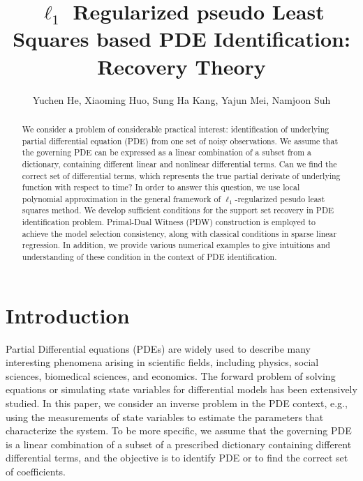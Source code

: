 \documentclass[a4paper,11pt]{article}
\theoremstyle{definition}
\begin{document}
\title{$\ell_1$ Regularized pseudo Least Squares based PDE Identification:
Recovery Theory }%
\author{Yuchen He, Xiaoming Huo, Sung Ha Kang, Yajun Mei, Namjoon Suh}
\maketitle
\begin{abstract}
We consider a problem of considerable practical interest: identification of underlying partial differential equation (PDE) from one set of noisy observations.  We assume that the governing PDE can be expressed as a linear combination  of a subset from a  dictionary, containing different linear and nonlinear differential terms.
Can we find the correct set of differential terms, which represents the true partial derivate of underlying function with respect to time? In order to answer this question, we use local polynomial approximation in the general framework of $\ell_{1}$-regularized pesudo least squares method.  We develop sufficient conditions for the support set recovery in PDE identification problem. Primal-Dual Witness (PDW) construction is employed to achieve the model selection consistency, along with classical conditions in sparse linear regression. In addition, we provide various numerical examples to give intuitions and understanding of these condition in the context of PDE identification.
\end{abstract}

\section{Introduction}

Partial Differential equations (PDEs) are widely used to describe many interesting phenomena arising in scientific fields, including physics, social sciences, biomedical sciences, and economics. The forward problem of solving equations or simulating state variables for differential models has been extensively studied. In this paper, we consider an  inverse problem in the PDE context, e.g., using the measurements of state variables to estimate the parameters that characterize the system. To be more specific, we assume that the governing PDE is a linear combination of a subset of a prescribed dictionary containing different differential terms, and the objective is to identify PDE or to find the correct set of coefficients.

\end{document}
